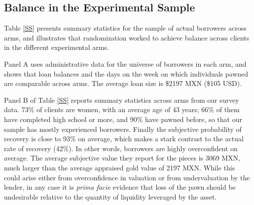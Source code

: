 \documentclass[oneside,11pt]{article}
\begin{document}


   



    
\subsection{Balance in the Experimental Sample}
Table \ref{SS} presents summary statistics for the sample of actual borrowers across arms, and illustrates that randomization worked to achieve balance across clients in the different experimental arms. 

Panel A uses administrative data for the universe of borrowers in each arm, and shows that loan balances and the days on the week on which individuals pawned are comparable across arms.  The average loan size is \$2197 MXN (\$105 USD).


Panel B of Table \ref{SS} reports summary statistics across arms from our survey data. 73\% of clients are women, with an average age of 43 years; 66\% of them have completed high school or more, and 90\% have pawned before, so that our sample has mostly experienced borrowers. Finally the subjective probability of recovery is close to 93\% on average, which makes a stark contrast to the actual rate of recovery (42\%).  In other words, borrowers are highly overconfident on average. The average subjective value they report for the pieces is 3069 MXN, much larger than the average appraised gold value of 2197 MXN.  While this could arise either from overconfidence in valuation or from undervaluation by the lender, in any case it is \textit{prima facie} evidence that loss of the pawn should be undesirable relative to the quantity of liquidity leveraged by the asset. 
\end{document}
